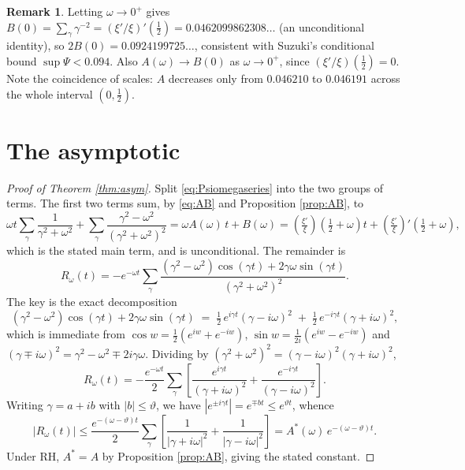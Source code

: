 \documentclass[11pt,reqno]{amsart}
\theoremstyle{plain}
\theoremstyle{definition}
\newtheorem{remark}[theorem]{Remark}
\newcommand{\lxi}[1]{\left(\tfrac{\xi'}{\xi}\right)\!#1}
\begin{document}
\begin{remark}\label{rem:B0}
Letting $\omega\to0^{+}$ gives
$B(0)=\sum_\gamma\gamma^{-2}=(\xi'/\xi)'(\tfrac12)=0.0462099862308\ldots$ (an unconditional
identity), so $2B(0)=0.0924199725\ldots$, consistent with Suzuki's conditional bound
$\sup\Psi<0.094$. Also $A(\omega)\to B(0)$ as $\omega\to0^{+}$, since $(\xi'/\xi)(\tfrac12)=0$.
Note the coincidence of scales: $A$ decreases only from $0.046210$ to $0.046191$ across the whole
interval $(0,\tfrac12)$.
\end{remark}

\section{The asymptotic}\label{sec:asym}

\begin{proof}[Proof of Theorem \ref{thm:asym}]
Split \eqref{eq:Psiomegaseries} into the two groups of terms. The first two terms sum, by
\eqref{eq:AB} and Proposition \ref{prop:AB}, to
\[
  \omega t\sum_\gamma\frac{1}{\gamma^{2}+\omega^{2}}
  +\sum_\gamma\frac{\gamma^{2}-\omega^{2}}{(\gamma^{2}+\omega^{2})^{2}}
  =\omega A(\omega)\,t+B(\omega)
  =\lxi{\left(\tfrac12+\omega\right)}t+\lxi{'\left(\tfrac12+\omega\right)},
\]
which is the stated main term, and is unconditional. The remainder is
\begin{equation}\label{eq:R}
  R_\omega(t)=-e^{-\omega t}\sum_\gamma
  \frac{(\gamma^{2}-\omega^{2})\cos(\gamma t)+2\gamma\omega\sin(\gamma t)}
       {(\gamma^{2}+\omega^{2})^{2}} .
\end{equation}
The key is the exact decomposition
\begin{equation}\label{eq:Rdecomp}
  (\gamma^{2}-\omega^{2})\cos(\gamma t)+2\gamma\omega\sin(\gamma t)
  \;=\;\tfrac12\,e^{i\gamma t}(\gamma-i\omega)^{2}\;+\;\tfrac12\,e^{-i\gamma t}(\gamma+i\omega)^{2},
\end{equation}
which is immediate from $\cos w=\tfrac12(e^{iw}+e^{-iw})$, $\sin w=\tfrac1{2i}(e^{iw}-e^{-iw})$ and
$(\gamma\mp i\omega)^{2}=\gamma^{2}-\omega^{2}\mp2i\gamma\omega$. Dividing by
$(\gamma^{2}+\omega^{2})^{2}=(\gamma-i\omega)^{2}(\gamma+i\omega)^{2}$,
\begin{equation}\label{eq:Rclean}
  R_\omega(t)=-\frac{e^{-\omega t}}2\sum_\gamma
  \left[\frac{e^{i\gamma t}}{(\gamma+i\omega)^{2}}+\frac{e^{-i\gamma t}}{(\gamma-i\omega)^{2}}\right].
\end{equation}
Writing $\gamma=a+ib$ with $|b|\le\vartheta$, we have $|e^{\pm i\gamma t}|=e^{\mp bt}\le
e^{\vartheta t}$, whence
\[
  |R_\omega(t)|\le \frac{e^{-(\omega-\vartheta) t}}{2}\sum_\gamma
  \left[\frac{1}{|\gamma+i\omega|^{2}}+\frac{1}{|\gamma-i\omega|^{2}}\right]
  =A^{*}(\omega)\,e^{-(\omega-\vartheta)t}.
\]
Under RH, $A^{*}=A$ by Proposition \ref{prop:AB}, giving the stated constant.
\end{proof}
\end{document}
